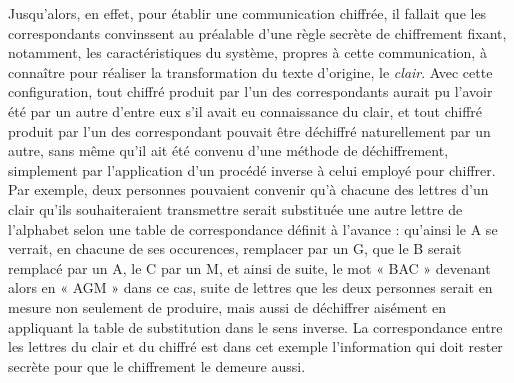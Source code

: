 Jusqu’alors, en effet, pour établir une communication chiffrée, il fallait que les correspondants
convinssent au préalable d’une règle secrète de chiffrement fixant, 
notamment, les caractéristiques du système, propres à cette communication, à
connaître pour réaliser la transformation du texte d’origine, le {\it clair}.
Avec cette configuration, tout chiffré produit par l’un des correspondants aurait pu l’avoir été par
un autre d’entre eux s’il avait eu connaissance du clair, et tout chiffré produit par l’un
des correspondant pouvait être déchiffré naturellement par un autre, sans même qu’il ait été convenu
d’une méthode de déchiffrement, simplement par l’application d’un procédé inverse à celui employé
pour chiffrer.
Par exemple, deux personnes pouvaient convenir qu’à chacune des lettres d’un clair qu’ils
souhaiteraient transmettre serait substituée une autre lettre de l’alphabet selon une table de
correspondance définit à l’avance : qu’ainsi le A se verrait, en chacune de ses occurences,
remplacer par un G, que le B serait remplacé par un A, le C par un M,
et ainsi de suite, le mot « BAC » devenant alors en « AGM » dans ce cas, suite
de lettres que les deux personnes serait en mesure non seulement de produire, mais aussi de
déchiffrer aisément en appliquant la table de substitution dans le sens inverse.
La correspondance entre les lettres du clair et du chiffré est dans cet exemple l’information qui
doit rester secrète pour que le chiffrement le demeure aussi.



